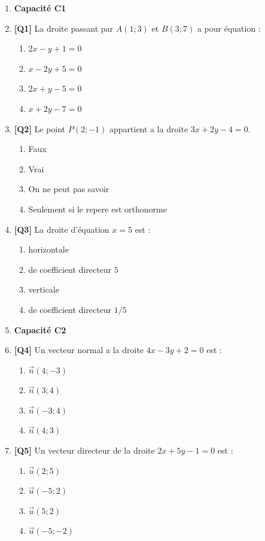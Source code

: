\begin{enumerate}

\item[] \textbf{Capacité C1}

\item \textbf{[Q1]} La droite passant par $A(1 ; 3)$ et $B(3 ; 7)$ a pour équation :
  \begin{enumerate}[label=\Alph*.]
    \item $2x - y + 1 = 0$
    \item $x - 2y + 5 = 0$
    \item $2x + y - 5 = 0$
    \item $x + 2y - 7 = 0$
  \end{enumerate}

\item \textbf{[Q2]} Le point $P(2 ; -1)$ appartient a la droite $3x + 2y - 4 = 0$.
  \begin{enumerate}[label=\Alph*.]
    \item Faux
    \item Vrai
    \item On ne peut pas savoir
    \item Seulement si le repere est orthonorme
  \end{enumerate}

\item \textbf{[Q3]} La droite d'équation $x = 5$ est :
  \begin{enumerate}[label=\Alph*.]
    \item horizontale
    \item de coefficient directeur $5$
    \item verticale
    \item de coefficient directeur $1/5$
  \end{enumerate}

\item[] \textbf{Capacité C2}

\item \textbf{[Q4]} Un vecteur normal a la droite $4x - 3y + 2 = 0$ est :
  \begin{enumerate}[label=\Alph*.]
    \item $\vec{n}(4 ; -3)$
    \item $\vec{n}(3 ; 4)$
    \item $\vec{n}(-3 ; 4)$
    \item $\vec{n}(4 ; 3)$
  \end{enumerate}

\item \textbf{[Q5]} Un vecteur directeur de la droite $2x + 5y - 1 = 0$ est :
  \begin{enumerate}[label=\Alph*.]
    \item $\vec{u}(2 ; 5)$
    \item $\vec{u}(-5 ; 2)$
    \item $\vec{u}(5 ; 2)$
    \item $\vec{u}(-5 ; -2)$
  \end{enumerate}


\end{enumerate}
